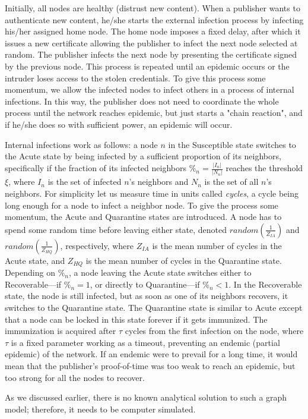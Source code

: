 Initially, all nodes are healthy (distrust new content). When a publisher wants to authenticate new content, he/she starts the external infection process by infecting his/her assigned home node. The home node imposes a fixed delay, after which it issues a new certificate allowing the publisher to infect the next node selected at random. The publisher infects the next node by presenting the certificate signed by the previous node. This process is repeated until an epidemic occurs or the intruder loses access to the stolen credentials. To give this process some momentum, we allow the infected nodes to infect others in a process of internal infections. In this way, the publisher does not need to coordinate the whole process until the network reaches epidemic, but just starts a "chain reaction", and if he/she does so with sufficient power, an epidemic will occur.

Internal infections work as follows: a node $n$ in the Susceptible state switches to the Acute state by being infected by a sufficient proportion of its neighbors, specifically if the fraction of its infected neighbors $\%_n = \frac{|I_n|}{|N_n|}$ reaches the threshold $\xi$, where $I_n$ is the set of infected $n$'s neighbors and $N_n$ is the set of all $n$'s neighbors. For simplicity let us measure time in units called \textit{cycles}, a cycle being long enough for a node to infect a neighbor node. To give the process some momentum, the Acute and Quarantine states are introduced. A node has to spend some random time before leaving either state, denoted $random(\frac{1}{Z_{IA}})$ and $random(\frac{1}{Z_{HQ}})$, respectively, where $Z_{IA}$ is the mean number of cycles in the Acute state, and $Z_{HQ}$ is the mean number of cycles in the Quarantine state. Depending on $\%_n$, a node leaving the Acute state switches either to Recoverable––if $\%_n = 1$, or directly to Quarantine––if $\%_n < 1$. In the Recoverable state, the node is still infected, but as soon as one of its neighbors recovers, it switches to the Quarantine state. The Quarantine state is similar to Acute except that a node can be locked in this state forever if it gets immunized. The immunization is acquired after $\tau$ cycles from the first infection on the node, where $\tau$ is a fixed parameter working as a timeout, preventing an endemic (partial epidemic) of the network. If an endemic were to prevail for a long time, it would mean that the publisher's proof-of-time was too weak to reach an epidemic, but too strong for all the nodes to recover.

As we discussed earlier, there is no known analytical solution to such a graph model; therefore, it needs to be computer simulated.

